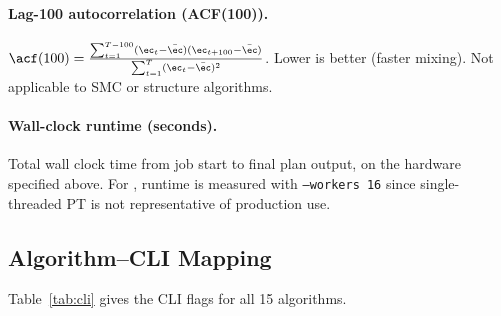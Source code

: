 \paragraph{Lag-100 autocorrelation (ACF(100)).}
$\acf(100) = \frac{\sum_{t=1}^{T-100}(\ec_t - \bar{\ec})(\ec_{t+100}
- \bar{\ec})}{\sum_{t=1}^T (\ec_t - \bar{\ec})^2}$.
Lower is better (faster mixing). Not applicable to SMC or structure algorithms.

\paragraph{Wall-clock runtime (seconds).}
Total wall clock time from job start to final plan output, on the hardware
specified above.
For \pt{}, runtime is measured with \texttt{--workers 16} since single-threaded
PT is not representative of production use.

\subsection{Algorithm--CLI Mapping}

Table~\ref{tab:cli} gives the CLI flags for all 15 algorithms.

